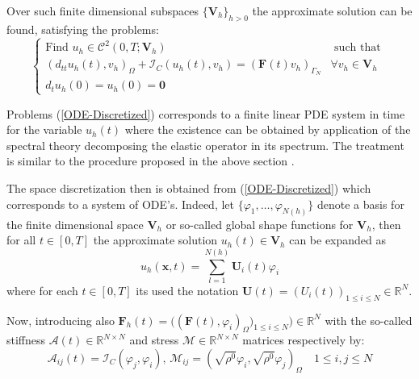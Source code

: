 Over such finite dimensional subspaces $\{ \mathbf{V}_h\}_{h>0}$ the approximate solution can be found, satisfying the problems:
\begin{equation}
\label{ODE-Discretized}
    \left \{
    \begin{array}{cc}
        \text{Find } u_h \in \mathcal{C}^2(0,T; \mathbf{V}_h) & \text{ such that } \\
        (d_{tt} u_h(t), v_h)_{\Omega} + \mathcal{I}_C(u_h(t), v_h) = (\mathbf{F}(t) v_h)_{\Gamma_N} & \forall v_h \in \mathbf{V}_h\\
        d_t u_h(0) = u_h(0) = \mathbf{0} & 
    \end{array}
    \right. 
\end{equation}

Problems (\ref{ODE-Discretized}) corresponds to a finite linear PDE system in time for the variable $u_h(t)$ where the existence can be obtained by application of the spectral theory decomposing the elastic operator in its spectrum. The treatment is similar to the procedure proposed in the above section \cite{raviart1983introduction}.

The space discretization then is obtained from (\ref{ODE-Discretized}) which corresponds to a system of ODE's. Indeed, let $\{ \varphi_1, \dots, \varphi_{N(h)} \}$ denote a basis for the finite dimensional space $\mathbf{V}_h$ or so-called global shape functions for $\mathbf{V}_h$, then for all $t \in [0,T]$ the approximate solution $u_h(t) \in \mathbf{V}_h$ can be expanded as
\begin{equation*}
    u_h(\mathbf{x},t) = \sum \limits_{l=1}^{N(h)} \mathbf{U}_i(t) \varphi_i
\end{equation*}
where for each $t \in [0,T]$ its used the notation $\mathbf{U}(t) = (U_i(t))_{1 \leq i \leq N} \in \mathbb{R}^N$.

Now, introducing also $\mathbf{F}_h(t) = \big( (\mathbf{F}(t), \varphi_i)_{\Omega} \big)_{1 \leq i \leq N} \big) \in \mathbb{R}^N$ with the so-called stiffness $\mathcal{A}(t) \in \mathbb{R}^{N \times N}$ and stress $\mathcal{M} \in \mathbb{R}^{N \times N}$ matrices respectively by:
\begin{equation*}
    \mathcal{A}_{ij}(t) = \mathcal{I}_C(\varphi_j, \varphi_i), \, \mathcal{M}_{ij} = (\sqrt{\rho^0} \varphi_i , \sqrt{\rho^0}\varphi_j)_{\Omega} \quad 1 \leq i,j \leq N
\end{equation*}

